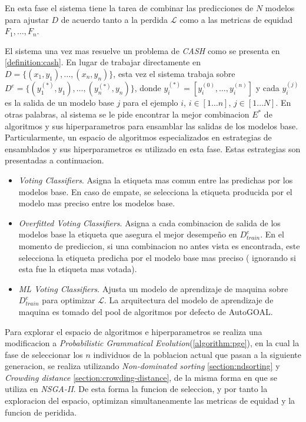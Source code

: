 En esta fase el sistema tiene la tarea de combinar las predicciones de $N$ modelos para ajustar $D$ de acuerdo tanto a la perdida $\mathcal{L}$ como a las metricas de equidad $F_1, \dots, F_n$.

El sistema una vez mas resuelve un problema de \emph{CASH} como se presenta en \ref{definition:cash}. En lugar de trabajar directamente en $D = \{(x_1,y_1),\dots, (x_n,y_n)\}$, esta vez el sistema trabaja sobre $D^e = \{(y_1^{(*)}, y_1),\dots,(y_n^{(*)}, y_n)\}$, donde $y_i^{(*)} = [y_i^{(0)},\dots,y_i^{(n)}]$ y cada $y_i^{(j)}$ es la salida de un modelo base $j$ para el ejemplo $i$, $i\in[1 \dots n]$, $j\in[1 \dots N]$. En otras palabras, al sistema se le pide encontrar la mejor combinacion $E^*$ de algoritmos y sus hiperparametros para ensamblar las salidas de los modelos base. Particularmente, un espacio de algoritmos especializados en estrategias de ensamblados y sus hiperparametros es utilizado en esta fase. Estas estrategias son presentadas a continuacion.

\begin{itemize}
    \item \emph{Voting Classifiers}. Asigna la etiqueta mas comun entre las predichas por los modelos base. En caso de empate,  se selecciona la etiqueta producida por el modelo mas preciso entre los modelos base.
    \item \emph{Overfitted Voting Classifiers}. Asigna a cada combinacion de salida de los modelos base la etiqueta que asegura el mejor desempeño en $D_{train}^e$. En el momento de prediccion, si una combinacion no antes vista es encontrada, este selecciona la etiqueta predicha por el modelo base mas preciso ( ignorando si esta fue la etiqueta mas votada).
    \item \emph{ML Voting Classifiers}. Ajusta un modelo de aprendizaje de maquina sobre $D_{train}^e$ para optimizar $\mathcal{L}$. La arquitectura del modelo de aprendizaje de maquina es tomado del pool de algoritmos por defecto de AutoGOAL.
\end{itemize}

Para explorar el espacio de algoritmos e hiperparametros se realiza una modificacion a \emph{Probabilistic Grammatical Evolution}(\ref{algorithm:pge}), en la cual la fase de seleccionar los $n$ individuos de la poblacion actual que pasan a la siguiente generacion, se realiza utilizando \emph{Non-dominated sorting} \ref{section:ndsorting} y \emph{Crowding distance} \ref{section:crowding-distance}, de la misma forma en que se utiliza en \emph{NSGA-II}. De esta forma la funcion de seleccion, y por tanto la exploracion del espacio, optimizan simultaneamente las metricas de equidad y la funcion de peridida.
